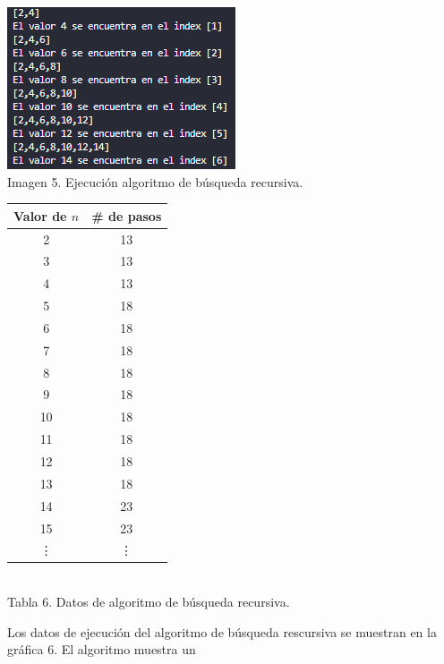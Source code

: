 \documentclass[12pt,twoside]{article}
\begin{document}
\begin{minipage}{.45\linewidth}
  \centering
  \includegraphics[width=1\linewidth]{images/busquedarecursiva.png}
  \\
  Imagen 5. Ejecución algoritmo de búsqueda recursiva.
\end{minipage}\hfill
\begin{minipage}{.45\linewidth}
  \centering
  \begin{tabular}{|c|c|}
    \hline
    \textbf{Valor de $n$} & \textbf{\# de pasos} \\
    \hline
    2  & 13 \\
    3  & 13 \\
    4  & 13 \\
    5  & 18 \\
    6  & 18 \\
    7  & 18 \\
    8  & 18 \\
    9  & 18 \\
    10 & 18 \\
    11 & 18 \\
    12 & 18 \\
    13 & 18 \\
    14 & 23 \\
    15 & 23 \\
    \vdots & \vdots\\
    \hline
  \end{tabular}
  \\
  Tabla 6. Datos de algoritmo de búsqueda recursiva.
\end{minipage}
\par
Los datos de ejecución del algoritmo de búsqueda rescursiva se muestran en la gráfica 6. El algoritmo muestra un
\end{document}
